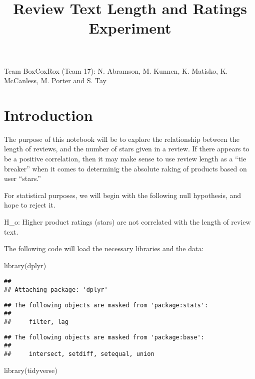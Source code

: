 \documentclass[
]{article}
\title{Review Text Length and Ratings Experiment}
\author{}
\date{\vspace{-2.5em}}
\newenvironment{Shaded}{\begin{snugshade}}{\end{snugshade}}
\newcommand{\FunctionTok}[1]{\textcolor[rgb]{0.00,0.00,0.00}{#1}}
\newcommand{\NormalTok}[1]{#1}
\begin{document}
\maketitle

Team BoxCoxRox (Team 17): N. Abramson, M. Kunnen, K. Matisko, K.
McCanless, M. Porter and S. Tay

\hypertarget{introduction}{%
\section{Introduction}\label{introduction}}

The purpose of this notebook will be to explore the relationship between
the length of reviews, and the number of stars given in a review. If
there appears to be a positive correlation, then it may make sense to
use review length as a ``tie breaker'' when it comes to determinig the
absolute raking of products based on user ``stars.''

For statistical purposes, we will begin with the following null
hypothesis, and hope to reject it.

H\_o: Higher product ratings (stars) are not correlated with the length
of review text.

The following code will load the necessary libraries and the data:

\begin{Shaded}
\begin{Highlighting}[]
\FunctionTok{library}\NormalTok{(dplyr)}
\end{Highlighting}
\end{Shaded}

\begin{verbatim}
## 
## Attaching package: 'dplyr'
\end{verbatim}

\begin{verbatim}
## The following objects are masked from 'package:stats':
## 
##     filter, lag
\end{verbatim}

\begin{verbatim}
## The following objects are masked from 'package:base':
## 
##     intersect, setdiff, setequal, union
\end{verbatim}

\begin{Shaded}
\begin{Highlighting}[]
\FunctionTok{library}\NormalTok{(tidyverse)}
\end{Highlighting}
\end{Shaded}
\end{document}
